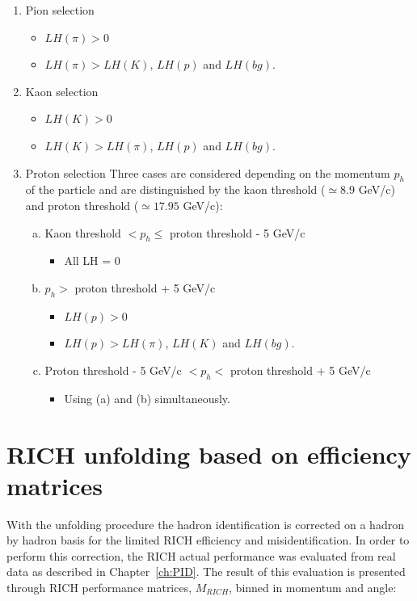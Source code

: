 \begin{enumerate}
  \item Pion selection
  \begin{itemize}
    \item $LH(\pi) > 0$
    \item $LH(\pi) > LH(K)$, $LH(p)$ and $LH(bg)$.
  \end{itemize}
  \item Kaon selection
  \begin{itemize}
    \item $LH(K) > 0$
    \item $LH(K) > LH(\pi)$, $LH(p)$ and $LH(bg)$.
  \end{itemize}
  \item Proton selection
  Three cases are considered depending on the momentum $p_{h}$ of the particle and are distinguished by the kaon threshold ($\simeq 8.9$ GeV/c) and proton threshold ($\simeq 17.95$ GeV/c):
  \begin{enumerate}[(a)]
    \item Kaon threshold $< p_{h} \leq$ proton threshold - 5 GeV/c
    \begin{itemize}
      \item All LH = $0$
    \end{itemize}
    \item $p_{h} >$ proton threshold + 5 GeV/c
    \begin{itemize}
      \item $LH(p) > 0$
      \item $LH(p) > LH(\pi)$, $LH(K)$ and $LH(bg)$.
    \end{itemize}
    \item Proton threshold - 5 GeV/c $< p_{h} <$ proton threshold + 5 GeV/c
    \begin{itemize}
      \item Using (a) and (b) simultaneously.
    \end{itemize}
  \end{enumerate}
\end{enumerate}


\section{RICH unfolding based on efficiency matrices}

With the unfolding procedure the hadron identification is corrected on a hadron by hadron basis for the limited RICH efficiency and misidentification.
In order to perform this correction, the RICH actual performance was evaluated from real data as described in Chapter~\ref{ch:PID}. The result of
this evaluation is presented through RICH performance matrices, $M_{RICH}$, binned in momentum
and angle:

